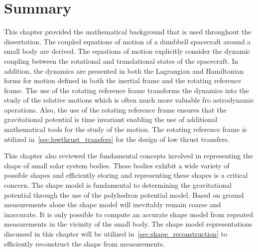 \section{Summary}

This chapter provided the mathematical background that is used throughout the dissertation.
The coupled equations of motion of a dumbbell spacecraft around a small body are derived.
The equations of motion explicitly consider the dynamic coupling between the rotational and translational states of the spacecraft.
In addition, the dynamics are presented in both the Lagrangian and Hamiltonian forms for motion defined in both the inertial frame and the rotating reference frame.
The use of the rotating reference frame transforms the dynamics into the study of the relative motions which is often much more valuable fro astrodynamic operations.
Also, the use of the rotating reference frame ensures that the gravitational potential is time invariant enabling the use of additional mathematical tools for the study of the motion.
The rotating reference frame is utilized in~\cref{sec:lowthrust_transfers} for the design of low thrust transfers.

This chapter also reviewed the fundamental concepts involved in representing the shape of small solar system bodies.
These bodies exhibit a wide variety of possible shapes and efficiently storing and representing these shapes is a critical concern.
The shape model is fundamental to determining the gravitational potential through the use of the polyhedron potential model.
Based on ground measurements alone the shape model will inevitably remain coarse and inaccurate.
It is only possible to compute an accurate shape model from repeated measurements in the vicinity of the small body.
The shape model representations discussed in this chapter will be utilized in~\cref{sec:shape_reconstruction} to efficiently reconstruct the shape from measurements.
